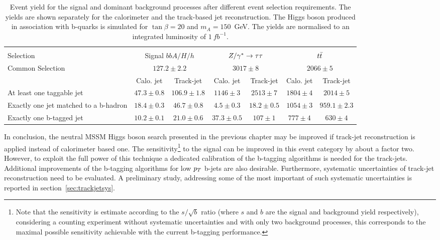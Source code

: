 \begin{table}[!t]
	\caption{Event yield for the signal and dominant background processes after different event selection requirements.
	The yields are shown separately for the calorimeter and the  track-based jet reconstruction.
	The Higgs boson produced in association with b-quarks is simulated for  $\tan\beta=20$ and $m_A=150$~GeV. The yields
		are normalised to an integrated luminosity of $1 ~ fb^{-1}$.}
	\vspace{3mm}

	\begin{footnotesize}
	\begin{tabular}{p{3.0cm} |c c| c c| c c }
	\hline
	\hline\\ 
Selection 	& 	\multicolumn{2}{|c|}{Signal $bbA/H/h$ }	&\multicolumn{2}{c|}{$Z/\gamma^*\rightarrow \tau\tau$}	& \multicolumn{2}{c}{$t\bar{t}$}	\\
	[0.5cm]
	\hline
Common Selection	&	\multicolumn{2}{|c|}{$127.2 \pm 2.2$} &\multicolumn{2}{c|}{$3017 \pm 8$} &\multicolumn{2}{c}{$2066 \pm 5$} \\[0.5cm]
			&	Calo. jet		&	Track-jet &Calo. jet	&Track-jet	&Calo. jet	&Track-jet \\[0.5cm]
At least one taggable jet& $47.3 \pm0.8$	&$106.9 \pm1.8$	 &$1146 \pm3 $	&$2513 \pm 7$	&$1804 \pm 4$	&$2014 \pm 5$ \\[1cm]
Exactly one jet matched to a b-hadron& $18.4 \pm 0.3$ & $46.7 \pm 0.8$ & $4.5 \pm 0.3$	&$18.2 \pm 0.5$ 	&$1054 \pm 3$	&$959.1 \pm 2.3$  \\[1cm]
Exactly one b-tagged jet&	$10.2 \pm0.1$	&$21.0 \pm 0.6$	& $37.3 \pm 0.5$ &$107 \pm 1$ &$777 \pm 4$	&$630 \pm4$ \\[1cm]
	\hline
	\hline
	
	\end{tabular}
	\end{footnotesize}
	\label{tab:tj_cj}
\end{table}

In conclusion, the neutral MSSM Higgs boson search presented in the previous chapter may be improved if track-jet
reconstruction is applied instead of calorimeter based one.
The sensitivity\footnote{Note that the sensitivity is estimate according to the $s/\sqrt{b}$ ratio (where $s$ and 
$b$ are the signal and background yield respectively), considering a counting experiment without systematic uncertainties and 
with only two background processes, this corresponds to the maximal possible sensitivity achievable 
 with the current b-tagging performance.} 
to the signal can be improved in this event
category by about a factor two. However, to exploit the full power of this technique a dedicated calibration of the 
b-tagging algorithms is  needed for the track-jets. Additional improvements of the b-tagging algorithms 
for low $p_{T}$ b-jets are also desirable. Furthermore, 
systematic uncertainties of track-jet reconstruction need to be evaluated. A preliminary study, addressing some
 of the most important of such systematic uncertainties is reported in section~\ref{sec:trackjetsys}.
 

